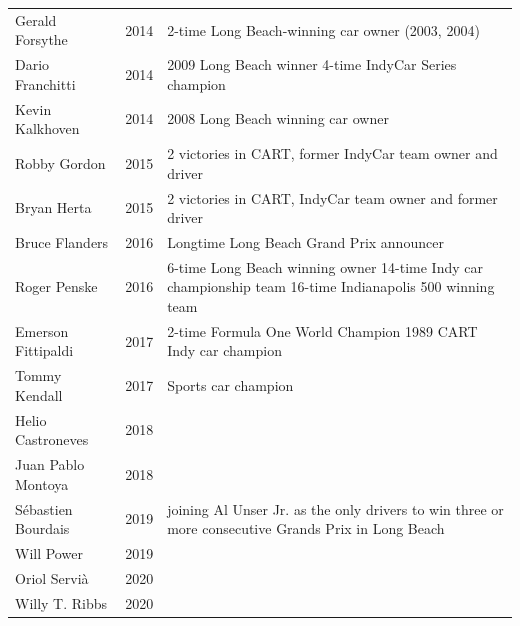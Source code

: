 \documentclass{article}
\begin{document}
\begin{tabular}{lll}
Gerald Forsythe & 2014 & 2-time Long Beach-winning car owner (2003, 2004) \\
Dario Franchitti & 2014 & 2009 Long Beach winner 4-time IndyCar Series champion \\
Kevin Kalkhoven & 2014 & 2008 Long Beach winning car owner \\
Robby Gordon & 2015 & 2 victories in CART, former IndyCar team owner and driver \\
Bryan Herta & 2015 & 2 victories in CART, IndyCar team owner and former driver \\
Bruce Flanders & 2016 & Longtime Long Beach Grand Prix announcer \\
Roger Penske & 2016 & 6-time Long Beach winning owner 14-time Indy car championship team 16-time Indianapolis 500 winning team \\
Emerson Fittipaldi & 2017 & 2-time Formula One World Champion 1989 CART Indy car champion \\
Tommy Kendall & 2017 & Sports car champion \\
Helio Castroneves & 2018 &  \\
Juan Pablo Montoya & 2018 &  \\
Sébastien Bourdais & 2019 & joining Al Unser Jr. as the only drivers to win three or more consecutive Grands Prix in Long Beach \\
Will Power & 2019 &  \\
Oriol Servià & 2020 &  \\
Willy T. Ribbs & 2020 &  \\
\bottomrule
\end{tabular}
\end{document}
